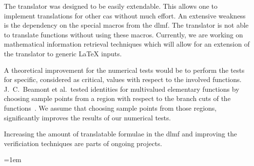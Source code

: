 \documentclass[a4paper,11pt]{article}
\theoremstyle{defTheoStyle}
\theoremstyle{defExampStyle}
\begin{document}
The translator was designed to be easily extendable. This allows one to implement translations for other \gls*{cas} without much effort.
An extensive weakness is the dependency on the special macros from the \gls*{dlmf}. The translator is not able to translate functions without using these macros. Currently, we are working on mathematical information retrieval techniques which will allow for an extension of the translator to generic \LaTeX{} inputs. 

A theoretical improvement for the numerical tests would be to perform the tests for specific, considered as critical, values with respect to the involved functions. J.~C.~Beamont et al.~tested  identities for multivalued elementary functions by choosing sample points from a region with respect to the branch cuts of the functions~\parencite{DBLP:journals/aaecc/BeaumontBDP07}. We assume that choosing sample points from those regions, significantly improves the results of our numerical tests. 

Increasing the amount of translatable formulae in the \gls*{dlmf} and improving the verificiation techniques are parts of ongoing projects. 

\emergencystretch=1em
\printbibliography

\end{document}
